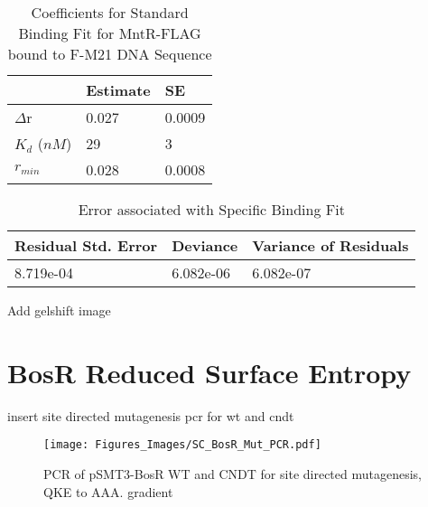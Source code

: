 \documentclass[12pt,twoside]{reedthesis}
\begin{document}
 \begin{table}[ht]
 	\caption{Coefficients for Standard Binding Fit for MntR-FLAG bound to F-M21 DNA Sequence} 
 	\label{MntRFLAGCoef}
 	\begin{tabularx}{3.0in}{|X|X|X|}
 		\hline
 		\textbf{ } & \textbf{Estimate} & \textbf{SE} \\ 
 		\hline
 		$\Delta$r & 0.027 & 0.0009 \\ 
 		\hline
 		$K_{d}$ ($nM$) &  29  &  3  \\ 
 		\hline
 		$r_{min}$ & 0.028 & 0.0008 \\ 
 		\hline
 	\end{tabularx}
 \end{table}
 
 \begin{table}[ht]
 \centering
 \parbox{5.0in}{\caption{Error associated with Specific Binding Fit}} 
 \begin{tabularx}{3.0in}{|X|X|X|}
 	\hline
 	\textbf{Residual Std. Error} & \textbf{Deviance} & \textbf{Variance of Residuals} \\ 
 	\hline
 	8.719e-04 & 6.082e-06 & 6.082e-07 \\ 
 	\hline
 \end{tabularx}
\end{table}


Add gelshift image 

\clearpage

   \section{BosR Reduced Surface Entropy}
   
   insert site directed mutagenesis pcr for wt and cndt
   
    		 \begin{figure}[h!tbp]
    		 	\centering
    		 	\texttt{[image: Figures\_Images/SC\_BosR\_Mut\_PCR.pdf]}
    		 	\caption[BosR QKE --> AAA Site Directied Mutagenesis PCR Gel]{PCR of pSMT3-BosR WT and CNDT for site directed mutagenesis, QKE to AAA. gradient}
    		 	\label{BosRmutPCR}
    		 \end{figure}
  
   
\appendix
{} 
   
\end{document}
